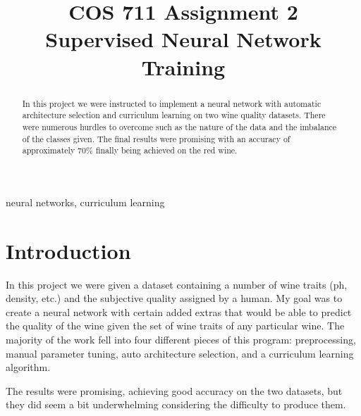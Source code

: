 \documentclass[conference]{IEEEtran}
\begin{document}
\title{COS 711 Assignment 2\\
{\footnotesize Supervised Neural Network Training}
}

\author{
}

\maketitle

\begin{abstract}
In this project we were instructed to implement a neural network with
automatic architecture selection and curriculum learning on two wine quality
datasets. There were numerous hurdles to overcome such as the nature of the data
and the imbalance of the classes given. The final results were promising with 
an accuracy of approximately 70\% finally being achieved on the red wine.
\end{abstract}

\begin{IEEEkeywords}
neural networks, curriculum learning
\end{IEEEkeywords}

\section{Introduction}
In this project we were given a dataset containing a number of wine traits
(ph, density, etc.) and the subjective quality assigned by a human. My goal was
to create a neural network with certain added extras that would be able to predict
the quality of the wine given the set of wine traits of any particular wine. The
majority of the work fell into four different pieces of this program: preprocessing,
manual parameter tuning, auto architecture selection, and a curriculum learning algorithm.

The results were promising, achieving good accuracy on the two datasets, but
they did seem a bit underwhelming considering the difficulty to produce them.
\end{document}
